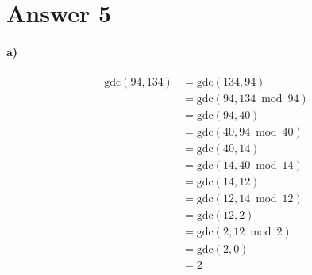 \documentclass[12pt]{article}
\newcommand\+{\mkern2mu}
\begin{document}
\section*{Answer 5}
\paragraph{a)}
\begin{align*}
\text{gdc}(94, 134) &= \text{gdc}(134, 94) \\
&= \text{gdc}(94, 134 \bmod 94) \\
&= \text{gdc}(94, 40) \\
&= \text{gdc}(40, 94 \bmod 40) \\
&= \text{gdc}(40, 14) \\
&= \text{gdc}(14, 40 \bmod 14) \\
&= \text{gdc}(14, 12) \\
&= \text{gdc}(12, 14 \bmod 12) \\
&= \text{gdc}(12, 2) \\
&= \text{gdc}(2, 12 \bmod 2) \\
&= \text{gdc}(2, 0) \\
&= 2
\end{align*}
\end{document}
